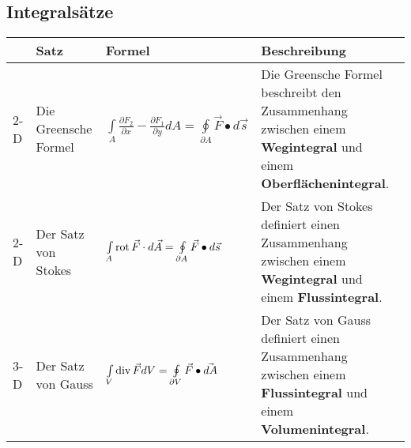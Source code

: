 \subsection{Integralsätze}
	\begin{tabular}{|p{0.4cm}||p{4cm}|p{5.7cm}|p{7cm}|}
	\hline
	& \textbf{Satz} & \textbf{Formel} & \textbf{Beschreibung}\\
	\hline
	\hline
	\begin{sideways}2-D \qquad \end{sideways} &
  	Die Greensche Formel &
	\begin{minipage}{6.7cm}
	    \vspace{0.1cm}
		$\int\limits_A \frac{\partial F_2}{\partial x} - \frac{\partial F_1}{\partial y} dA = \oint\limits_{\partial A}\vec{F}\bullet d\vec{s}$	 		    
	    \vspace{0.1cm}   
    \end{minipage}&
	\begin{minipage}{7cm}
	    \vspace{0.1cm}
		Die Greensche Formel beschreibt den Zusammenhang zwischen einem
		\textbf{Wegintegral} und einem \textbf{Oberflächenintegral}.
	    \vspace{0.1cm}   
    \end{minipage}\\
	\hline
	\begin{sideways}2-D \qquad \end{sideways} &
	Der Satz von Stokes &
	\begin{minipage}{6.7cm}
    	\vspace{0.1cm}
		$\int\limits_A \operatorname{rot} \vec{F}\cdot d\vec{A}  = \oint\limits_{\partial A}\vec{F}\bullet d\vec{s}$		 
		\vspace{0.1cm} 
    \end{minipage}&
	\begin{minipage}{7cm}
    	\vspace{0.1cm}
		Der Satz von Stokes definiert einen Zusammenhang zwischen einem
		\textbf{Wegintegral} und einem \textbf{Flussintegral}.	    
	    \vspace{0.1cm}   
    \end{minipage}\\
	\hline
	\begin{sideways}3-D \qquad \end{sideways} &
	Der Satz von Gauss  &
	\begin{minipage}{6.7cm}
	    \vspace{0.1cm}
		$\int\limits_V \operatorname{div} \vec F dV = \oint\limits_{\partial V} \vec F \bullet \vec{dA}$			    
	    \vspace{0.1cm}   
    \end{minipage}&
	\begin{minipage}{7cm}
    	\vspace{0.1cm}
		Der Satz von Gauss definiert einen Zusammenhang zwischen einem
		\textbf{Flussintegral} und einem \textbf{Volumenintegral}.	    
	    \vspace{0.1cm}    
    \end{minipage}\\
	\hline	
\end{tabular}
